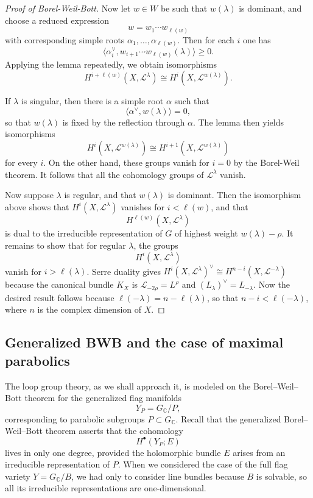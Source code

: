 \documentclass[12pt]{article}
\begin{document}
\begin{proof}[Proof of Borel-Weil-Bott]
Now let \(w\in W\) be such that \(w(\lambda)\) is dominant, and choose a reduced expression
\[
w = w_1\cdots w_{\ell(w)}
\]
with corresponding simple roots \(\alpha_1,\dots,\alpha_{\ell(w)}\). Then for each \(i\) one has
\[
\langle \alpha_i^\vee, w_{i+1}\cdots w_{\ell(w)}(\lambda)\rangle \ge 0.
\]
Applying the lemma repeatedly, we obtain isomorphisms
\[
H^{i+\ell(w)}(X,\mathcal L^\lambda)\cong H^i(X,\mathcal L^{w(\lambda)}).
\]

If \(\lambda\) is singular, then there is a simple root \(\alpha\) such that
\[
\langle \alpha^\vee, w(\lambda)\rangle = 0,
\]
so that \(w(\lambda)\) is fixed by the reflection through \(\alpha\). The lemma then yields isomorphisms
\[
H^i(X,\mathcal L^{w(\lambda)})\cong H^{i+1}(X,\mathcal L^{w(\lambda)})
\]
for every \(i\). On the other hand, these groups vanish for \(i=0\) by the Borel-Weil theorem. It follows that all the cohomology groups of \(\mathcal L^\lambda\) vanish.

Now suppose \(\lambda\) is regular, and that \(w(\lambda)\) is dominant. Then the isomorphism above shows that \(H^i(X,\mathcal L^\lambda)\) vanishes for \(i<\ell(w)\), and that
\[
H^{\ell(w)}(X,\mathcal L^\lambda)
\]
is dual to the irreducible representation of \(G\) of highest weight \(w(\lambda)-\rho\). It remains to show that for regular \(\lambda\), the groups
\[
H^i(X,\mathcal L^\lambda)
\]
vanish for \(i>\ell(\lambda)\). Serre duality gives $H^i(X,\mathcal L^\lambda)^\vee \cong H^{n-i}(X,\mathcal L^{-\lambda})$ because the canonical bundle $K_X$ is $\mathcal L_{-2\rho} = L^{\rho}$ and $(L_\lambda)^\vee = L_{-\lambda}$. Now the desired result follows because $\ell(-\lambda) = n - \ell(\lambda)$, so that $n-i < \ell(-\lambda)$, where $n$ is the complex dimension of $X$.
\end{proof}


\subsection{Generalized BWB and the case of maximal parabolics}

The loop group theory, as we shall approach it, is modeled on the Borel--Weil--Bott theorem for the generalized flag manifolds
\[
Y_P = G_{\mathbb C}/P,
\]
corresponding to parabolic subgroups \(P\subset G_{\mathbb C}\). Recall that the generalized Borel--Weil--Bott theorem asserts that the cohomology
\[
H^\bullet(Y_P;E)
\]
lives in only one degree, provided the holomorphic bundle \(E\) arises from an irreducible representation of \(P\). When we considered the case of the full flag variety \(Y=G_{\mathbb C}/B\), we had only to consider line bundles because $B$ is solvable, so all its irreducible representations are one-dimensional. 
\end{document}
